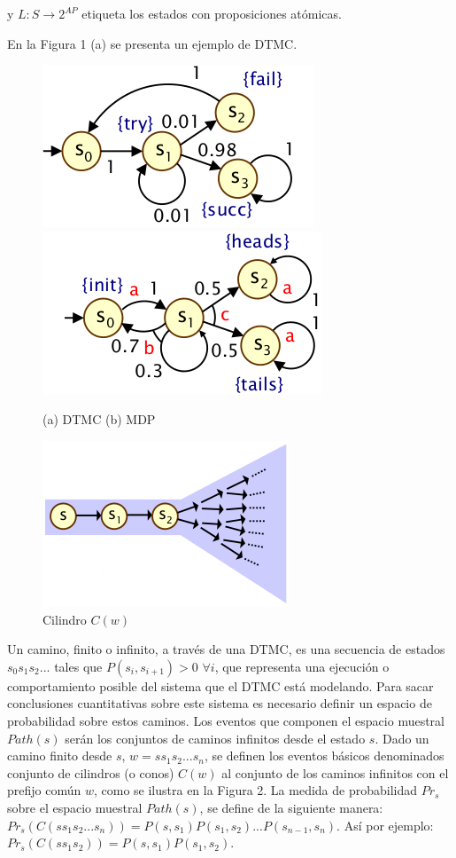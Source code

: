 \documentclass[11pt]{article}
\begin{document}
y $L: S \rightarrow 2^{AP}$ etiqueta los estados con proposiciones at\'omicas.

En la Figura 1 (a) se presenta un ejemplo de DTMC.

\begin{figure}[h]
	\includegraphics[scale=0.6]{DTMC.png} \includegraphics[scale=0.6]{MDP.png}
	\centering
	\caption{(a) DTMC \hspace{2cm} (b) MDP}
\end{figure}

\begin{figure}[h]
	\includegraphics[scale=0.6]{cone.png}
	\centering
	\caption{Cilindro $C(w)$}
\end{figure}

Un camino, finito o infinito, a trav\'es de una DTMC, es una secuencia de estados $s_0s_1s_2...$ tales que $P(s_i, s_{i+1}) > 0$ $\forall i$, que representa una ejecuci\'on o comportamiento posible del sistema que el DTMC est\'a modelando. Para sacar conclusiones cuantitativas sobre este sistema es necesario definir un espacio de probabilidad sobre estos caminos. Los eventos que componen el espacio muestral $Path(s)$ ser\'an los conjuntos de caminos infinitos desde el estado $s$.  Dado un camino finito desde $s$, $w = ss_1s_2...s_n$, se definen los eventos b\'asicos denominados conjunto de cilindros (o conos) $C(w)$ al conjunto de los caminos infinitos con el prefijo com\'un $w$, como se ilustra en la Figura 2. La medida de probabilidad $Pr_s$ sobre el espacio muestral $Path(s)$, se define de la siguiente manera: $Pr_s(C(ss_1s_2...s_n)) = P(s,s_1)P(s_1,s_2)...P(s_{n-1}, s_n)$. As\'i por ejemplo: $Pr_s(C(ss_1s_2)) = P(s,s_1)P(s_1,s_2)$. \\
\end{document}
